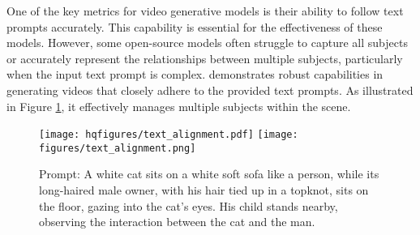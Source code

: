 One of the key metrics for video generative models is their ability to follow text prompts accurately. This capability is essential for the effectiveness of these models. However, some open-source models often struggle to capture all subjects or accurately represent the relationships between multiple subjects, particularly when the input text prompt is complex.
%
\nameofmethod{} demonstrates robust capabilities in generating videos that closely adhere to the provided text prompts. As illustrated in Figure \ref{fig:text-align}, it effectively manages multiple subjects within the scene.

\begin{figure}[h]
    \centering
    \ifhq
    \texttt{[image: hqfigures/text\_alignment.pdf]}
    \else
    \texttt{[image: figures/text\_alignment.png]}
    \fi
    \caption{{Prompt: A white cat sits on a white soft sofa like a person, while its long-haired male owner, with his hair tied up in a topknot, sits on the floor, gazing into the cat's eyes. His child stands nearby, observing the interaction between the cat and the man. } }
    \label{fig:text-align}
\end{figure}